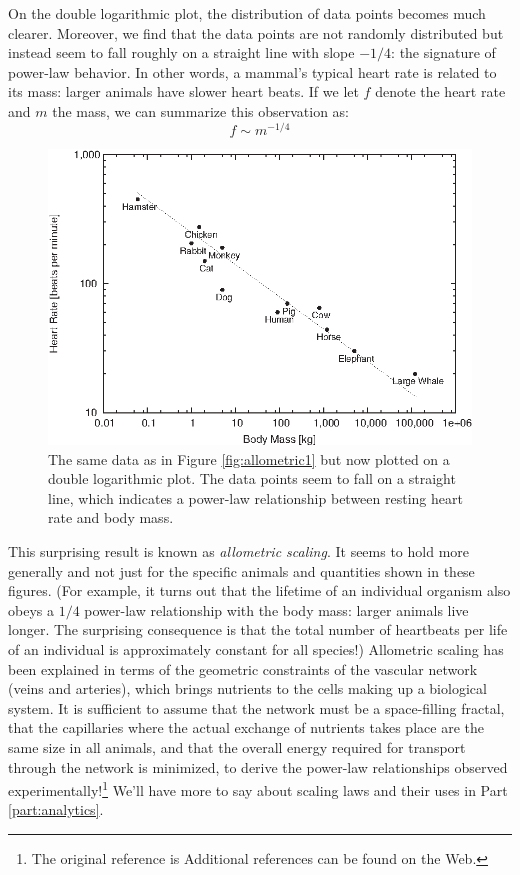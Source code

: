 On the double logarithmic plot, the distribution of data points
becomes much clearer. Moreover, we find that the data points are not
randomly distributed but instead seem to fall roughly on a straight
line with slope $-1/4$: the signature of power-law behavior. In other
words, a mammal's typical heart rate is related to its mass: larger
animals have slower heart beats. If we let $f$ denote the heart rate
and $m$ the mass, we can summarize this observation as:
%
\[
f \sim m^{-1/4}
\]

\begin{figure}
  \centerline{\includegraphics{img/allometric2}}
  \caption{The same data as in Figure \ref{fig:allometric1} but now
    plotted on a double logarithmic plot. The data points seem to fall
    on a straight line, which indicates a power-law relationship
    between resting heart rate and body mass.}
  \label{fig:allometric2} \vspace*{-6pt}
\end{figure}

This surprising result is known as \emph{allometric scaling}.  It seems
to hold more generally and not just for the specific animals and
quantities shown in these figures. (For example, it turns out that the
lifetime of an individual organism also obeys a $1/4$ power-law
relationship with the body mass: larger animals live longer. The
surprising consequence is that the total number of heartbeats per life
of an individual is approximately constant for all species!)
Allometric scaling has been explained in terms of the geometric
constraints of the vascular network (veins and arteries), which brings
nutrients to the cells making up a biological system.  It is
sufficient to assume that the network must be a space-filling fractal,
that the capillaries where the actual exchange of nutrients takes
place are the same size in all animals, and that the overall energy
required for transport  through the  network is
minimized, to derive the power-law relationships observed experimentally!\footnote{The
original
  reference is  Additional references
  can be found on the Web.}  We'll have more to say about scaling laws
and their uses in Part \ref{part:analytics}.

